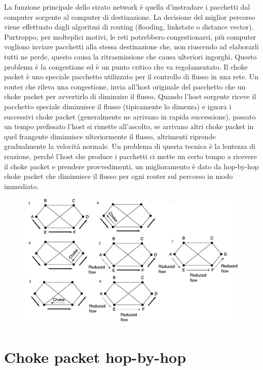 La funzione principale dello strato network è quella d’instradare i pacchetti dal computer sorgente al computer di destinazione. La decisione del miglior percorso viene effettuato dagli algoritmi di routing (flooding, linkstate o distance vector). Purtroppo, per molteplici motivi, le reti potrebbero congestionarsi, più computer vogliono inviare pacchetti alla stessa destinazione che, non riuscendo ad elaborarli tutti ne perde, questo causa la ritrasmissione che causa ulteriori ingorghi. Questo problema è la congestione ed è un punto critico che va regolamentato.
Il choke packet è uno speciale pacchetto utilizzato per il controllo di flusso in una rete. Un router che rileva una congestione, invia all’host originale del pacchetto che un choke packet per avvertirlo di diminuire il flusso. Quando l’host sorgente riceve il pacchetto speciale diminuisce il flusso (tipicamente lo dimezza) e ignora i successivi choke packet (generalmente ne arrivano in rapida successione), passato un tempo prefissato l’host si rimette all’ascolto, se arrivano altri choke packet in quel frangente diminuisce ulteriormente il flusso, altrimenti riprende gradualmente la velocità normale.
Un problema di questa tecnica è la lentezza di reazione, perché l’host che produce i pacchetti ci mette un certo tempo a ricevere il choke packet e prendere provvedimenti, un miglioramento è dato da hop-by-hop choke packet che diminuisce il flusso per ogni router sul percorso in modo immediato.
 
\begin{figure}[H]
\centering
\includegraphics[scale=0.6]{res/img/35_ChokePacket.png}
\end{figure}

\section{Choke packet hop-by-hop}

